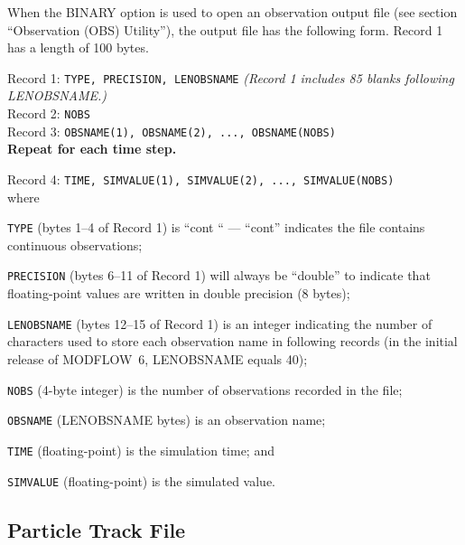 When the BINARY option is used to open an observation output file (see section ``Observation (OBS) Utility''), the output file has the following form. Record 1 has a length of 100 bytes.

\vspace{5mm}
\noindent Record 1: \texttt{TYPE, PRECISION, LENOBSNAME} \textit{(Record 1 includes 85 blanks following LENOBSNAME.)} \\
\noindent Record 2: \texttt{NOBS} \\
\noindent Record 3: \texttt{OBSNAME(1),  OBSNAME(2), ..., OBSNAME(NOBS)} \\

\vspace{12pt}
\noindent \textbf{Repeat for each time step.}

\vspace{12pt}
\noindent Record 4: \texttt{TIME, SIMVALUE(1), SIMVALUE(2), ..., SIMVALUE(NOBS)} \\
 
\vspace{12pt}
\noindent where

\begin{description} \itemsep0pt \parskip0pt 
\item \texttt{TYPE} (bytes 1--4 of Record 1) is ``cont `` ---  ``cont'' indicates the file contains continuous observations;
\item \texttt{PRECISION} (bytes 6--11 of Record 1) will always be ``double'' to indicate that floating-point values are written in double precision (8 bytes);
\item \texttt{LENOBSNAME} (bytes 12--15 of Record 1) is an integer indicating the number of characters used to store each observation name in following records (in the initial release of MODFLOW~6, LENOBSNAME equals 40);
\item \texttt{NOBS} (4-byte integer) is the number of observations recorded in the file;
\item \texttt{OBSNAME} (LENOBSNAME bytes) is an observation name;
\item \texttt{TIME} (floating-point) is the simulation time; and
\item \texttt{SIMVALUE} (floating-point) is the simulated value.
\end{description}


\newpage
\subsection{Particle Track File}

